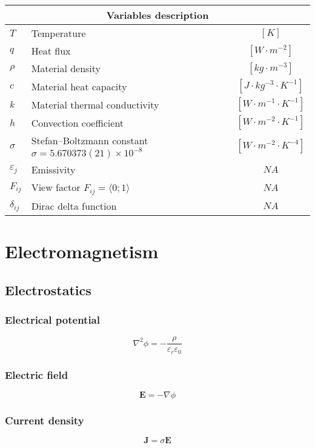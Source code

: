 \documentclass[a4paper,10pt]{book}
\begin{document}
\begin{tabular}{|l|l|c|}
    \hline
    \multicolumn{3}{|c|}{Variables description} \\
    \hline
    $T$ & Temperature & $[K]$ \\
    $q$ & Heat flux & $[W\cdot{m^{-2}}]$ \\
    $\rho$ & Material density & $[kg\cdot{m^{-3}}]$ \\
    $c$ & Material heat capacity & $[J\cdot{kg^{-3}}\cdot{K^{-1}}]$ \\
    $k$ & Material thermal conductivity & $[W\cdot{m^{-1}}\cdot{K^{-1}}]$ \\
    $h$ & Convection coefficient & $[W\cdot{m^{-2}}\cdot{K^{-1}}]$ \\
    $\sigma$ & Stefan–Boltzmann constant $\sigma=5.670373\left(21\right)\times10^{-8}$ & $[W{\cdot}m^{-2}{\cdot}K^{-4}]$ \\
    $\varepsilon_{j}$ & Emissivity & $NA$ \\
    $F_{ij}$ & View factor $F_{ij}=\langle0;1\rangle$ & $NA$ \\
    $\delta_{ij}$ & Dirac delta function & $NA$ \\
    \hline
\end{tabular}

\section{Electromagnetism}

\subsection{Electrostatics}

\subsubsection{Electrical potential}
    \begin{equation}
    \nabla^2\phi=-\frac{\rho}{\varepsilon_r\varepsilon_0}
    \end{equation}

\subsubsection{Electric field}
    \begin{equation}
    \mathbf{E}=-\nabla\phi
    \end{equation}

\subsubsection{Current density}
    \begin{equation}
    \mathbf{J}=\sigma\mathbf{E}
    \end{equation}
\end{document}
